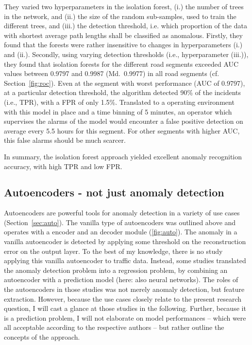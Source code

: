 \documentclass[conference]{IEEEtran}
\begin{document}
They varied two hyperparameters in the isolation forest, (i.) the number of trees in the network, and (ii.) the size of the random sub-samples, used to train the different trees, and (iii.) the detection threshold, i.e. which proportion of the data with shortest average path lengths shall be classified as anomalous. Firstly, they found that the forests were rather insensitive to changes in hyperparameters (i.) and (ii.). Secondly, using varying detection thresholds (i.e., hyperparameter (iii.)), they found that isolation forests for the different road segments exceeded AUC values between 0.9797 and 0.9987 (Md.~0.9977) in all road segments (cf. Section~\ref{fig:roc}). Even at the segment with worst performance (AUC of 0.9797), at a particular detection threshold, the algorithm detected 90\% of the incidents (i.e., TPR), with a FPR of only 1.5\%. Translated to a operating environment with this model in place and a time binning of 5 minutes, an operator which supervises the alarms of the model would encounter a false positive detection on average every 5.5 hours for this segment. 
For other segments with higher AUC, this false alarms should be much scarcer.


In summary, the isolation forest approach yielded excellent anomaly recognition accuracy, with high TPR and low FPR.

\subsection{Autoencoders - not just anomaly detection}

Autoencoders are powerful tools for anomaly detection in a variety of use cases (Section~\ref{sec:auto}). The vanilla type of autoencoders was outlined above and operates with a encoder and an decoder module (\ref{fig:auto}). The anomaly in a vanilla autoencoder is detected by applying some threshold on the reconstruction error on the output layer. To the best of my knowledge, there is no study applying this vanilla autoencoder to traffic data. Instead, some studies translated the anomaly detection problem into a regression problem, by combining an autoencoder with a prediction model (here: also neural networks). The roles of the autoencoders in those studies was not merely anomaly detection, but feature extraction. However, because the use cases closely relate to the present research question, I will cast a glance at those studies in the following. Further, because it is a prediction problem, I will not elaborate on model performances -- which were all acceptable according to the respective authors \cite{zhang2019deep, boquet2020variational} -- but rather outline the concepts of the approach.
\end{document}
